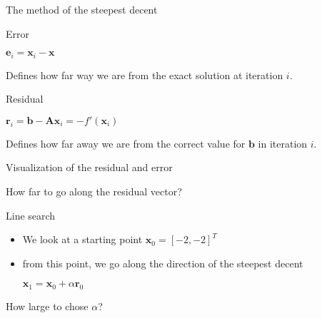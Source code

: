 \documentclass[\classoption]{beamer}
\begin{document}
\begin{frame}{The method of the steepest decent}

\begin{block}{Error}
\begin{center}
$\mathbf{e}_i = \mathbf{x}_i - \mathbf{x}$
\end{center}
Defines how far way we are from the exact solution at iteration $i$.
\end{block}

\begin{block}{Residual}
\begin{center}
$\mathbf{r}_i = \mathbf{b} - \mathbf{A}\mathbf{x}_i= -f'(\mathbf{x}_i)$
\end{center}
Defines how far away we are from the correct value for $\mathbf{b}$ in iteration $i$. 
\end{block}

\end{frame}


\begin{frame}{Visualization of the residual and error}
\begin{center}
\end{center}
\begin{center}
How far to go along the residual vector?
\end{center}
\end{frame}


\begin{frame}{Line search}

\begin{itemize}
\item We look at a starting point $\mathbf{x}_0=[-2,-2]^T$
\item from this point, we go along the direction of the steepest decent
\begin{center}
$\mathbf{x}_1 = \mathbf{x}_0 + \alpha \mathbf{r}_0$
\end{center}
\end{itemize}
How large to chose $\alpha$?
\end{frame}
\end{document}
